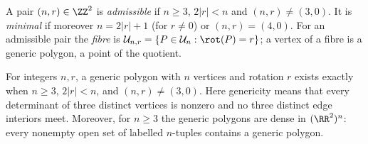 \begin{definition}\label{def:admissible}\leanok
A pair $(n,r)\in\ZZ^2$ is \emph{admissible} if $n\geq3$, $2|r|<n$ and
$(n,r)\neq(3,0)$. It is \emph{minimal} if moreover $n=2|r|+1$ (for $r\neq0$)
or $(n,r)=(4,0)$. For an admissible pair the \emph{fibre} is
$\mathcal U_{n,r}=\{P\in\mathcal U_n:\rot(P)=r\}$; a vertex of a fibre is a
generic polygon, a point of the quotient.
\end{definition}

\begin{lemma}
\label{lem:fibres}\leanok
For integers $n,r$, a generic polygon with $n$ vertices and rotation $r$
exists exactly when $n\geq3$, $2|r|<n$, and $(n,r)\ne(3,0)$.
Here genericity means that every determinant of three distinct vertices
is nonzero and no three distinct edge interiors meet. Moreover, for $n\geq3$
the generic polygons are dense in $(\RR^2)^n$: every nonempty open set of
labelled $n$-tuples contains a generic polygon.

\end{lemma}
